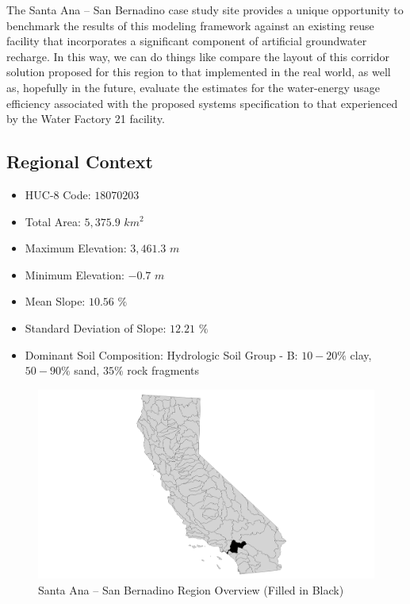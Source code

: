 The Santa Ana -- San Bernadino case study site provides a unique opportunity to benchmark the results of this modeling framework against an existing reuse facility that incorporates a significant component of artificial groundwater recharge. In this way, we can do things like compare the layout of this corridor solution proposed for this region to that implemented in the real world, as well as, hopefully in the future, evaluate the estimates for the water-energy usage efficiency associated with the proposed systems specification to that experienced by the Water Factory 21 facility. 

    \subsection{Regional Context}

    \begin{itemize}
      \setlength{\itemsep}{0cm}
      \setlength{\parskip}{0cm}
        \item HUC-8 Code: $18070203$
        \item Total Area: $5,375.9$ $km^2$
        \item Maximum Elevation: $3,461.3$ $m$
        \item Minimum Elevation: $-0.7$ $m$
        \item Mean Slope: $10.56$ $\%$
        \item Standard Deviation of Slope: $12.21$ $\%$
        \item Dominant Soil Composition: Hydrologic Soil Group - B: $10-20\%$ clay, $50-90\%$ sand, $35\%$ rock fragments
    \end{itemize}
    
        \begin{figure}[!h]
            \begin{center}
            \includegraphics[width=5.5in]{figures/SanBernadino_Overview.png}   
            \caption{Santa Ana -- San Bernadino Region Overview (Filled in Black)}
            \label{fig:SASBoverview}
            \end{center}
        \end{figure}


